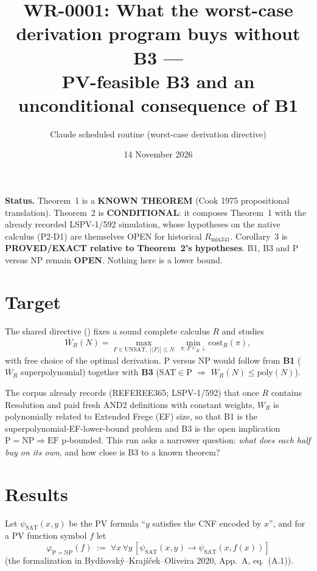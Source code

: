 \documentclass[11pt]{article}
\title{WR-0001: What the worst-case derivation program buys without B3 --- \\
PV-feasible B3 and an unconditional consequence of B1}
\author{Claude scheduled routine (worst-case derivation directive)}
\date{14 November 2026}
\newcommand{\Wbar}{\overline W}
\begin{document}
\maketitle

\noindent\textbf{Status.} Theorem~1 is a \textbf{KNOWN THEOREM} (Cook 1975
propositional translation). Theorem~2 is \textbf{CONDITIONAL}: it composes
Theorem~1 with the already recorded LSPV-1/592 simulation, whose hypotheses on
the native calculus (P2-D1) are themselves OPEN for historical
$R_{\mathrm{mix341}}$. Corollary~3 is \textbf{PROVED/EXACT relative to
Theorem~2's hypotheses}. B1, B3 and P versus NP remain \textbf{OPEN}.
Nothing here is a lower bound.

\section{Target}
The shared directive ()
fixes a sound complete calculus $R$ and studies
\[
 \Wbar_R(N)=\max_{F\in\mathrm{UNSAT},\ |\langle F\rangle|\le N}\
 \min_{\pi:F\vdash_R\bot}\mathrm{cost}_R(\pi),
\]
with free choice of the optimal derivation. P versus NP would follow from
\textbf{B1} ($\Wbar_R$ superpolynomial) together with
\textbf{B3} (SAT$\in$P $\Rightarrow$ $\Wbar_R(N)\le\mathrm{poly}(N)$).

The corpus already records (REFEREE365; LSPV-1/592) that once $R$ contains
Resolution and paid fresh AND2 definitions with constant weights, $W_R$ is
polynomially related to Extended Frege (EF) size, so that B1 is the
superpolynomial-EF-lower-bound problem and B3 is the open implication
$\mathrm{P}=\mathrm{NP}\Rightarrow\mathrm{EF}$ p-bounded. This run asks a
narrower question: \emph{what does each half buy on its own}, and how close is
B3 to a known theorem?

\section{Results}

Let $\psi_{\mathrm{SAT}}(x,y)$ be the PV formula ``$y$ satisfies the CNF
encoded by $x$'', and for a PV function symbol $f$ let
\[
 \varphi_{\mathrm{P=NP}}(f)\;:=\;\forall x\,\forall y\,
 [\psi_{\mathrm{SAT}}(x,y)\rightarrow\psi_{\mathrm{SAT}}(x,f(x))]
\]
(the formalization in Bydžovský--Krajíček--Oliveira 2020, App.~A, eq.~(A.1)).
\end{document}
